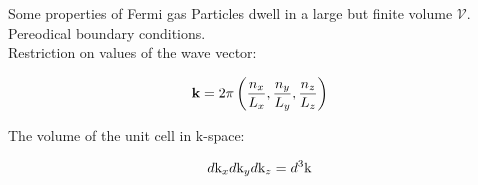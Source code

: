 \begin{frame}{Some properties of Fermi gas}
  Particles dwell in a large but finite volume $\mathcal{V}$.\\
  Pereodical boundary conditions.\\
  Restriction on values of the wave vector:

  \begin{equation}
    \textbf{k} = 2 \pi \left ( \frac{n_x}{L_x},  \frac{n_y}{L_y}, \frac{n_z}{L_z} \right)
  \end{equation}

  The volume of the unit cell in k-space:

  \begin{equation}
    d\text{k}_x d\text{k}_y d\text{k}_z = d^3\text{k}
  \end{equation}
\end{frame}
